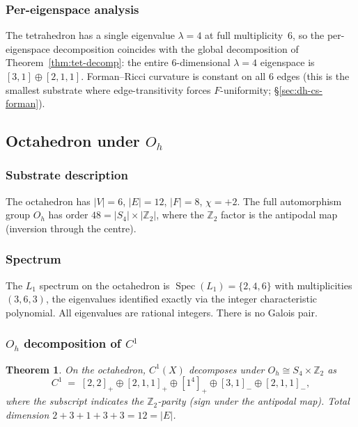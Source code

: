 \documentclass[12pt,a4paper]{article}
\newtheorem{theorem}{Theorem}[section]
\theoremstyle{definition}
\theoremstyle{remark}
\newcommand{\bZ}{\mathbb{Z}}
\DeclareMathOperator{\Spec}{Spec}
\begin{document}
\subsubsection{Per-eigenspace analysis}\label{sec:tet-per-cluster}

The tetrahedron has a single eigenvalue $\lambda = 4$ at full
multiplicity~$6$, so the per-eigenspace decomposition coincides with the
global decomposition of Theorem~\ref{thm:tet-decomp}: the entire
$6$-dimensional $\lambda = 4$ eigenspace is $[3,1] \oplus [2,1,1]$.
Forman--Ricci curvature is constant on all $6$ edges (this is the
smallest substrate where edge-transitivity forces $F$-uniformity;
\S\ref{sec:dh-cs-forman}).

\subsection{Octahedron under $O_h$}\label{sec:oct}

\subsubsection{Substrate description}\label{sec:oct-description}

The octahedron has $|V| = 6$, $|E| = 12$, $|F| = 8$, $\chi = +2$. The full
automorphism group $O_h$ has order $48 = |S_4| \times |\bZ_2|$, where the
$\bZ_2$ factor is the antipodal map (inversion through the centre).

\subsubsection{Spectrum}\label{sec:oct-spectrum}

The $L_1$ spectrum on the octahedron is $\Spec(L_1) = \{2, 4, 6\}$ with
multiplicities $(3, 6, 3)$, the eigenvalues identified exactly via the
integer characteristic polynomial. All eigenvalues are rational integers.
There is no Galois pair.

\subsubsection{$O_h$ decomposition of $C^1$}\label{sec:oct-decomp}

\begin{theorem}\label{thm:oct-decomp}
On the octahedron, $C^1(X)$ decomposes under $O_h \cong S_4 \times \bZ_2$
as
\[
  C^1 \;=\; [2,2]_+ \oplus [2,1,1]_+ \oplus [1^4]_+
    \oplus [3,1]_- \oplus [2,1,1]_-,
\]
where the subscript indicates the $\bZ_2$-parity (sign under the antipodal
map). Total dimension $2 + 3 + 1 + 3 + 3 = 12 = |E|$.
\end{theorem}
\end{document}

